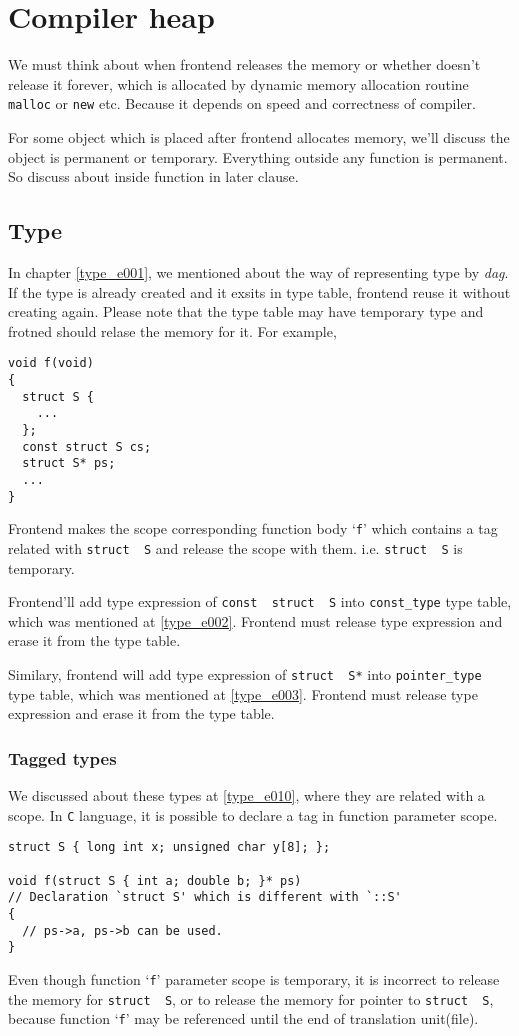\section{Compiler heap}

We must think about when frontend releases the memory
or whether doesn't release it forever,
which is allocated by dynamic memory allocation routine
{\tt{malloc}} or {\tt{new}} etc.
Because it depends on speed and correctness of compiler.

For some object which is placed after frontend allocates memory,
we'll discuss the object is permanent or temporary.
Everything outside any function is permanent.
So discuss about inside function in later clause.

\subsection{Type}

In chapter \ref{type_e001}, we mentioned about the way of
representing type by {\em dag}.
If the type is already created and it exsits in type table,
frontend reuse it without creating again.
Please note that the type table may have temporary type
and frotned should relase the memory for it.
For example,
\begin{verbatim}
void f(void)
{
  struct S {
    ...
  };
  const struct S cs;
  struct S* ps;
  ...
}
\end{verbatim}
Frontend makes the scope corresponding function body `{\tt{f}}'
which contains a tag related with {\tt{struct\,\,S}}
and release the scope with them. i.e. {\tt{struct\,\,S}} is
temporary.

Frontend'll add type expression of {\tt{const\,\,struct\,\,S}}
into {\tt{const\_type}} type table, which was mentioned at
\ref{type_e002}. Frontend must release type expression and
erase it from the type table.

Similary, 
frontend will add type expression of {\tt{struct\,\,S*}}
into {\tt{pointer\_type}} type table, which was mentioned at
\ref{type_e003}. Frontend must release type expression and
erase it from the type table.

\subsubsection{Tagged types}

We discussed about these types at \ref{type_e010},
where they are related with a scope.
In {\tt{C}} language, it is possible to declare a tag
in function parameter scope.
\begin{verbatim}
struct S { long int x; unsigned char y[8]; };

void f(struct S { int a; double b; }* ps)
// Declaration `struct S' which is different with `::S'
{
  // ps->a, ps->b can be used.
}
\end{verbatim}
Even though function `{\tt{f}}' parameter scope is temporary,
it is incorrect to release the memory for {\tt{struct\,\,S}},
or to release the memory for pointer to {\tt{struct\,\,S}},
because function `{\tt{f}}' may be referenced until
the end of translation unit(file).

